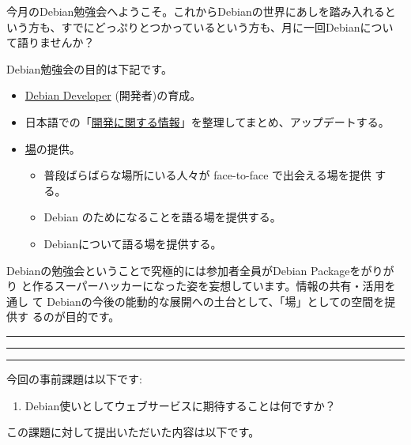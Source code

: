\documentclass[mingoth,a4paper]{jsarticle}
\begin{document}
\begin{multicols}{2}
 

 今月のDebian勉強会へようこそ。これからDebianの世界にあしを踏み入れると
 いう方も、すでにどっぷりとつかっているという方も、月に一回Debianについ
 て語りませんか？

 Debian勉強会の目的は下記です。

 \begin{itemize}
 \item \underline{Debian Developer} (開発者)の育成。
 \item 日本語での「\underline{開発に関する情報}」を整理してまとめ、アップデートする。
 \item \underline{場}の提供。
 \begin{itemize}
  \item 普段ばらばらな場所にいる人々が face-to-face で出会える場を提供
	する。
  \item Debian のためになることを語る場を提供する。
  \item Debianについて語る場を提供する。
 \end{itemize}
 \end{itemize}		

 Debianの勉強会ということで究極的には参加者全員がDebian Packageをがりがり
 と作るスーパーハッカーになった姿を妄想しています。情報の共有・活用を通し
 て Debianの今後の能動的な展開への土台として、「場」としての空間を提供す
 るのが目的です。

\end{multicols}

\newpage

\begin{minipage}[b]{0.2\hsize}
 \colorbox{titleback}{}
\end{minipage}
\begin{minipage}[b]{0.8\hsize}
\hrule
\vspace{2mm}
\hrule
\begin{multicols}{2}
\tableofcontents
\end{multicols}
\vspace{2mm}
\hrule
\end{minipage}


今回の事前課題は以下です:
\begin{enumerate}
 \item Debian使いとしてウェブサービスに期待することは何ですか？
\end{enumerate}
この課題に対して提出いただいた内容は以下です。
\begin{multicols}{2}
{\small

}
\end{multicols}
\end{document}

